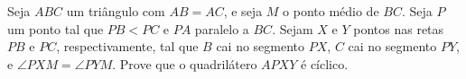 Seja $ABC$ um triângulo com $AB=AC$, e seja $M$ o ponto médio de $BC$. Seja $P$ um ponto tal que $PB<PC$ e $PA$ paralelo a $BC$. Sejam $X$ e $Y$ pontos nas retas $PB$ e $PC$, respectivamente, tal que $B$ cai no segmento $PX$, $C$ cai no segmento $PY$, e $\angle PXM = \angle PYM$. Prove que o quadrilátero $APXY$ é cíclico.
